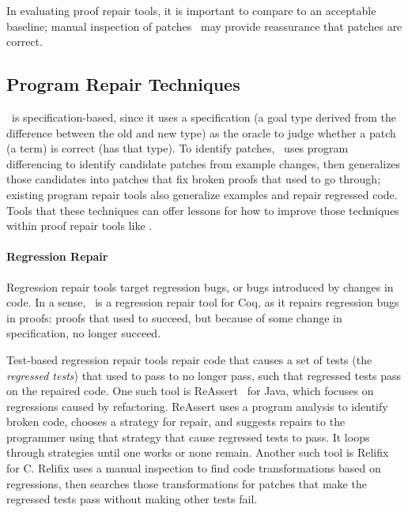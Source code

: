 In evaluating proof repair tools, it is important to compare to an acceptable baseline; 
manual inspection of patches~\cite{DBLP:journals/corr/abs-1811-02429} 
may provide reassurance that patches are correct.

\subsection{Program Repair Techniques}
\label{sec:techniques}

\sysname\ is specification-based, since it uses a specification (a goal type derived from the difference
between the old and new type) as the oracle to judge whether a patch (a term) is correct (has that type). To identify
patches, \sysname\ uses program differencing to identify candidate patches from example changes, 
then generalizes those candidates into patches that fix broken proofs that used to go through; existing program repair tools also generalize
examples and repair regressed code.
Tools that these techniques can offer lessons for how to improve those techniques within proof repair tools like \sysname.

\paragraph{Regression Repair} Regression repair tools target regression bugs,
or bugs introduced by changes in code.
In a sense, \sysname\ is a regression repair tool for Coq, as it repairs regression bugs in proofs:
proofs that used to succeed, but because of some change in specification, no longer succeed.

Test-based regression repair tools repair code that causes a set of tests (the \textit{regressed tests}) that used to pass to no longer pass,
such that regressed tests pass on the repaired code.
One such tool is ReAssert~\cite{daniel2009reassert} for Java,
which focuses on regressions caused by refactoring.
ReAssert uses a program analysis to identify broken code,
chooses a strategy for repair, and suggests repairs to the programmer using that strategy that cause regressed tests to pass.
It loops through strategies until one works or none remain.
Another such tool is Relifix~\cite{Tan:2015:RAR:2818754.2818813} for C.
Relifix uses a manual inspection to find code transformations based on regressions, then searches those transformations for 
patches that make the regressed tests pass without making other tests fail. %

